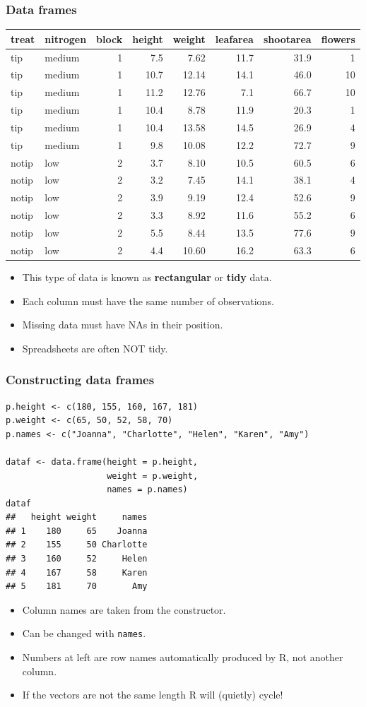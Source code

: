 \documentclass{beamer}
\newcommand{\lst}[1]{\lstinline{#1}}
\newcommand{\lsting}[1]{\begin{lstlisting}[basicstyle=#1]}
\newcommand{\bi}{\begin{itemize}}
\newcommand{\li}{\item}
\newcommand{\ei}{\end{itemize}}
\newcommand{\bfr}[1]{\begin{frame}[fragile]\frametitle{{ #1 }}}
\begin{document}
\bfr{Data frames}
{\scriptsize
\begin{tabular}{llrrrrrr}
treat&	nitrogen&	block&	height&	weight&	leafarea&	shootarea&	flowers\\\hline
tip&	medium&	1&	7.5&	7.62&	11.7&	31.9&	1\\
tip&	medium&	1&	10.7&	12.14&	14.1&	46.0&	10\\
tip&	medium&	1&	11.2&	12.76&	7.1&	66.7&	10\\
tip&	medium&	1&	10.4&	8.78&	11.9&	20.3&	1\\
tip&	medium&	1&	10.4&	13.58&	14.5&	26.9&	4\\
tip&	medium&	1&	9.8&	10.08&	12.2&	72.7&	9\\
notip&	low&	2&	3.7&	8.10&	10.5&	60.5&	6\\
notip&	low&	2&	3.2&	7.45&	14.1&	38.1&	4\\
notip&	low&	2&	3.9&	9.19&	12.4&	52.6&	9\\
notip&	low&	2&	3.3&	8.92&	11.6&	55.2&	6\\
notip&	low&	2&	5.5&	8.44&	13.5&	77.6&	9\\
notip&	low&	2&	4.4&	10.60&	16.2&	63.3&	6\\
\end{tabular}
}
\bi
\li This type of data is known as {\bf rectangular} or {\bf tidy} data.
\li Each column must have the same number of observations.
\li Missing data must have NAs in their position.
\li Spreadsheets are often NOT tidy.
\ei

\end{frame}

\bfr{Constructing data frames}
\lsting{\scriptsize}
p.height <- c(180, 155, 160, 167, 181)
p.weight <- c(65, 50, 52, 58, 70)
p.names <- c("Joanna", "Charlotte", "Helen", "Karen", "Amy")

dataf <- data.frame(height = p.height, 
                    weight = p.weight, 
                    names = p.names)
dataf
##   height weight     names
## 1    180     65    Joanna
## 2    155     50 Charlotte
## 3    160     52     Helen
## 4    167     58     Karen
## 5    181     70       Amy

\end{lstlisting}
\bi
\li Column names are taken from the constructor.
\li Can be changed with \lst{names}.
\li Numbers at left are row names automatically produced by R, not another column.
\li If the vectors are not the same length R will (quietly) cycle!
\ei
\end{frame}
\end{document}

